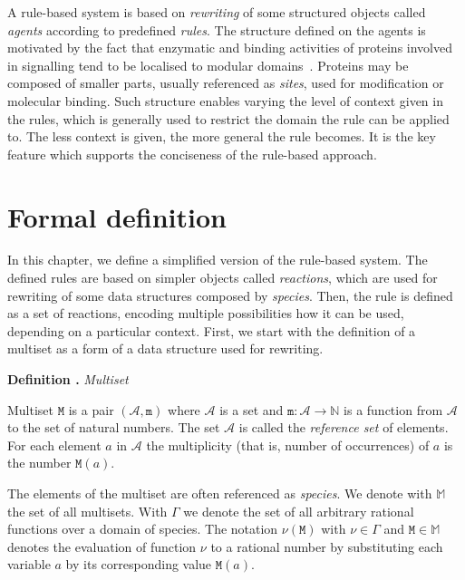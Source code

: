 \documentclass[11pt,a4paper]{report}
\newcounter{counter}[section]
\renewcommand{\thecounter}{\thechapter.\arabic{counter}}
\newenvironment{definition}[1]{\bigskip\refstepcounter{counter}\noindent\textbf{Definition \thecounter } \emph{#1} \par\nopagebreak\noindent \begin{itshape}}{\end{itshape}\bigskip}
\begin{document}
A rule-based system is based on \emph{rewriting} of some structured objects called \emph{agents} according to predefined \emph{rules}. The structure defined on the agents is motivated by the fact that enzymatic and binding activities of proteins involved in signalling tend to be localised to modular domains~\cite{pawson2003assembly}. Proteins may be composed of smaller parts, usually referenced as \emph{sites}, used for modification or molecular binding. Such structure enables varying the level of context given in the rules, which is generally used to restrict the domain the rule can be applied to. The less context is given, the more general the rule becomes. It is the key feature which supports the conciseness of the rule-based approach.

\section{Formal definition}

In this chapter, we define a simplified version of the rule-based system. The defined rules are based on simpler objects called \emph{reactions}, which are used for rewriting of some data structures composed by \emph{species}. Then, the rule is defined as a set of reactions, encoding multiple possibilities how it can be used, depending on a particular context. First, we start with the definition of a multiset as a form of a data structure used for rewriting.

\begin{definition}{Multiset}
Multiset $\mathtt{M}$ is a pair $(\mathcal{A}, \mathtt{m})$ where $\mathcal{A}$ is a set and $ \mathtt{m} : \mathcal{A} \rightarrow \mathbb{N} $ is a function from $\mathcal{A}$ to the set of natural numbers. The set $\mathcal{A}$ is called the \emph{reference set} of elements. For each element $\mathit{a}$ in $\mathcal{A}$ the multiplicity (that is, number of occurrences) of $\mathit{a}$ is the number $\mathtt{M}(\mathit{a})$.
\end{definition}

The elements of the multiset are often referenced as \emph{species}. We denote with $\mathbb{M}$ the set of all multisets. With $\Gamma$ we denote the set of all arbitrary rational functions over a domain of species. The notation $\nu(\mathtt{M})$ with $\nu \in \Gamma$ and $\mathtt{M} \in \mathbb{M}$ denotes the evaluation of function $\nu$ to a rational number by substituting each variable $\mathit{a}$ by its corresponding value $\mathtt{M}(\mathit{a})$.
\end{document}
